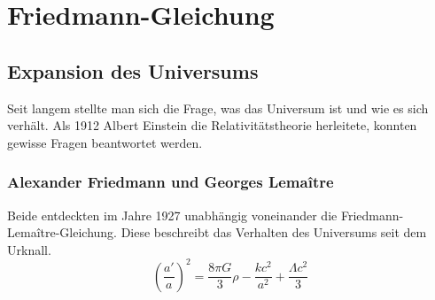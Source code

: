 \chapter{Friedmann-Gleichung\label{chapter:thema}}
\begin{refsection}
\printbibliography[heading=subbibliography]
\section{Expansion des Universums}
Seit langem stellte man sich die Frage, was das Universum ist und wie es sich verh\"{a}lt. Als 1912 Albert Einstein die Relativit\"{a}tstheorie herleitete, konnten gewisse Fragen beantwortet werden.
\subsection{Alexander Friedmann und Georges Lema\^{i}tre}
Beide entdeckten im Jahre 1927 unabh\"{a}ngig voneinander die Friedmann-Lema\^{i}tre-Gleichung. Diese beschreibt das Verhalten des Universums seit dem Urknall. 
\begin{equation}
\left(\frac{a'}{a}\right) ^2 = \frac{8 \pi G}{3} \rho - \frac{k c^2}{a^2} + \frac{\Lambda c^2}{3}
\end{equation}

\end{refsection}
